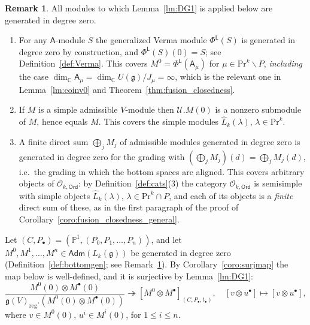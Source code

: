 \documentclass[12pt,a4paper,reqno]{amsart}
\numberwithin{equation}{section}
\theoremstyle{definition}
\newtheorem{remark}[theorem]{Remark}
\newcommand{\g}{\mathfrak{g}}
\newcommand{\C}{\mathbb{C}}
\renewcommand{\P}{\mathbb{P}}
\def\O{\mathcal{O}}
\def\Ord{\mathsf{Ord}}
\def\Adm{\mathsf{Adm}}
\def\L{\mathsf{L}}
\def\Pr{\mathrm{Pr}}
\def\la{\lambda}
\def\bs{\backslash}
\def\o{\otimes}
\def\scrU{\mathscr{U}}
\def\ds{\dots}
\def\A{\mathsf{A}}
\def\reg{\mathrm{reg}}
\begin{document}
\begin{remark}\label{rmk:bottomgen_holds}
All modules to which Lemma~\ref{lm:DG1} is applied below are generated in degree zero.
\begin{enumerate}
\item For any $\A$-module $S$ the generalized Verma module $\Phi^\L(S)$ is generated in
degree zero by construction, and $\Phi^\L(S)(0)=S$; see Definition~\ref{def:Verma}. This
covers $M^0=\Phi^\L(\A_\mu)$ for $\mu\in \Pr^k\bs P$, \emph{including} the case
$\dim_\C \A_\mu=\dim_\C U(\g)/J_\mu=\infty$, which is the relevant one in
Lemma~\ref{lm:coinv0} and Theorem~\ref{thm:fusion_closedness}.
\item If $M$ is a simple admissible $V$-module then $\scrU.M(0)$ is a nonzero submodule of
$M$, hence equals $M$. This covers the simple modules $\hat{L}_k(\la)$, $\la\in \Pr^k$.
\item A finite direct sum $\bigoplus_{j}M_j$ of admissible modules generated in degree
zero is generated in degree zero for the grading with $\left(\bigoplus_j M_j\right)(d)=\bigoplus_j M_j(d)$,
i.e.\ the grading in which the bottom spaces are aligned. This covers arbitrary objects of
$\O_{k,\Ord}$: by Definition~\ref{def:cats}(3) the category $\O_{k,\Ord}$ is semisimple with
simple objects $\hat{L}_k(\la)$, $\la\in \Pr^k\cap P$, and each of its objects is a
\emph{finite} direct sum of these, as in the first paragraph of the proof of
Corollary~\ref{coro:fusion_closedness_general}.
\end{enumerate}
\end{remark}

Let $(C,P_\bullet)=(\P^1,(P_0,P_1,\ds,P_n))$, and let $M^0,M^1,\ds ,M^n\in \Adm(L_k(\g))$ be generated in degree zero (Definition~\ref{def:bottomgen}; see Remark~\ref{rmk:bottomgen_holds}). 
By Corollary~\ref{coro:surjmap} the map below is well-defined, and it is surjective by Lemma~\ref{lm:DG1}:
\[
    \frac{M^0(0)\o M^\bullet(0)}{\g(V)_\reg.(M^0(0)\o M^\bullet(0))}\twoheadrightarrow [M^0\o M^\bullet]_{(C,P_\bullet,t_\bullet)},\quad [v\o u^\bullet]\mapsto [v\o u^\bullet],
\]
 where $v\in M^0(0)$, $u^i\in M^i(0)$, for $1\leq i\leq n$.
\end{document}
